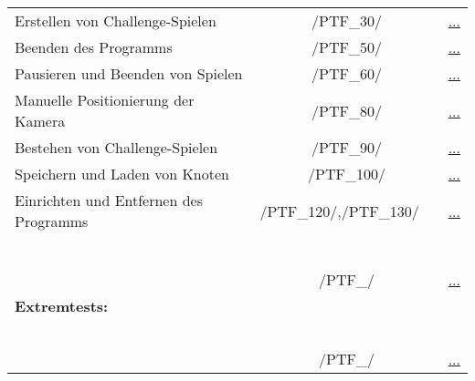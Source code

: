 \begin{longtable}{p{0.5\hsize}p{0.275\hsize}p{0.275\hsize}}
	 \multicolumn{1}{L{6.5cm}}{Erstellen von Challenge-Spielen}
	& \multicolumn{1}{c}{/PTF\_30/}
	& \multicolumn{1}{c}{\hyperref[]{...}}
	
	\\
	
	  \multicolumn{1}{L{6.5cm}}{Beenden des Programms}
	& \multicolumn{1}{c}{/PTF\_50/}
	& \multicolumn{1}{c}{\hyperref[]{...}}
	
	\\
	
	  \multicolumn{1}{L{6.5cm}}{Pausieren und Beenden von Spielen}
	& \multicolumn{1}{c}{/PTF\_60/}
	& \multicolumn{1}{c}{\hyperref[]{...}}
	
	\\
	
	  \multicolumn{1}{L{6.5cm}}{Manuelle Positionierung der Kamera}
	& \multicolumn{1}{c}{/PTF\_80/}
	& \multicolumn{1}{c}{\hyperref[]{...}}
	
	\\
	
	  \multicolumn{1}{L{6.5cm}}{Bestehen von Challenge-Spielen}
	& \multicolumn{1}{c}{/PTF\_90/}
	& \multicolumn{1}{c}{\hyperref[]{...}}
	
	\\
	
	  \multicolumn{1}{L{6.5cm}}{Speichern und Laden von Knoten}
	& \multicolumn{1}{c}{/PTF\_100/}
	& \multicolumn{1}{c}{\hyperref[]{...}}
	
	\\
	
	  \multicolumn{1}{L{6.5cm}}{Einrichten und Entfernen des Programms}
	& \multicolumn{1}{C{3cm}}{/PTF\_120/,\newline/PTF\_130/~~}
	& \multicolumn{1}{c}{\hyperref[]{...}}
	
	\\
	


\newpage




	  \multicolumn{3}{l}{\textbf{Negativtests:}}
	  
	\\
	
	  \multicolumn{3}{l}{~}
	  
	\\
	
	  \multicolumn{1}{L{6.5cm}}{}
	& \multicolumn{1}{c}{/PTF\_/}
	& \multicolumn{1}{c}{\hyperref[]{...}}
	
	\\
	

	  \multicolumn{3}{l}{\textbf{Extremtests:}}
	  
	\\
	
	  \multicolumn{3}{l}{~}
	  
	\\
	
	  \multicolumn{1}{L{6.5cm}}{}
	& \multicolumn{1}{c}{/PTF\_/}
	& \multicolumn{1}{c}{\hyperref[]{...}}
	
	\\
	
\end{longtable}


